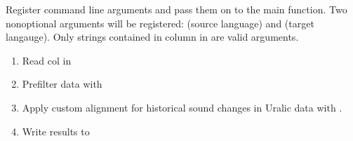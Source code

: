 \documentclass[letterpaper,10pt,english]{sphinxmanual}
\begin{document}
{{{{\begin{fulllineitems}
\label{\detokenize{mkedictor:ronataswestoldturkiccommands.maketoedict_rc.register}}
\pysigstartsignatures
{}
\pysigstopsignatures
\sphinxAtStartPar
Register command line arguments and pass them on to the main function.
Two non\sphinxhyphen{}optional arguments will be registered:
 (source language) and  (target langauge).
Only strings contained in column  in  are valid
arguments.

\end{fulllineitems}


\begin{fulllineitems}
\label{\detokenize{mkedictor:ronataswestoldturkiccommands.maketoedict_rc.run}}
\pysigstartsignatures
{}
\pysigstopsignatures\begin{enumerate}
%
\item {} 
\sphinxAtStartPar
Read col  in 

\item {} 
\sphinxAtStartPar
Prefilter data with 

\item {} 
\sphinxAtStartPar
Apply custom alignment for historical sound changes in Uralic data
with .

\item {} 
\sphinxAtStartPar
Write results to 

\end{enumerate}


\end{fulllineitems}}}}}
\end{document}
